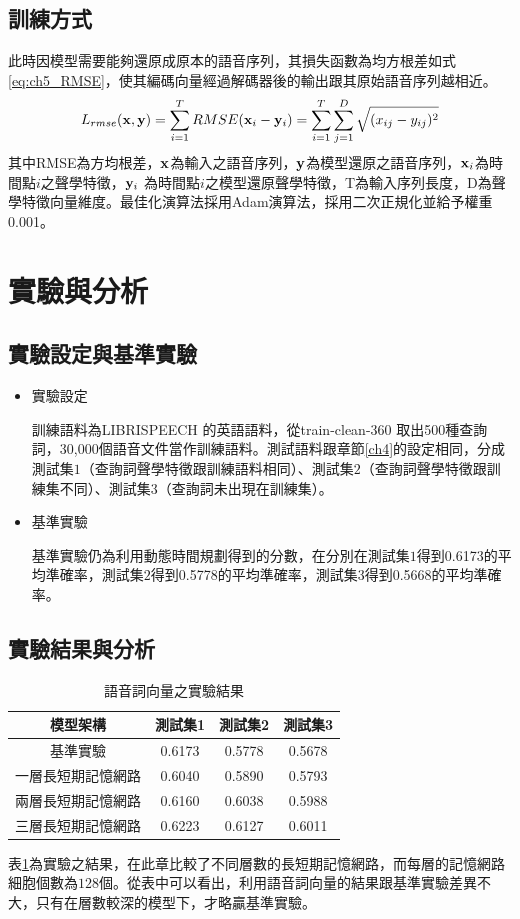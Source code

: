 \subsection{訓練方式}
此時因模型需要能夠還原成原本的語音序列，其損失函數為均方根差如式\ref{eq:ch5_RMSE}，使其編碼向量經過解碼器後的輸出跟其原始語音序列越相近。
\begin{equation}
\label{eq:ch5_RMSE}
L_{rmse} (\bold{x},\bold{y}) = \sum_{i=1}^{T}
RMSE(\bold{x}_i-\bold{y}_i) = \sum_{i=1}^{T} \sum_{j=1}^D \sqrt{(x_{ij}-y_{ij})^2}
\end{equation}
其中RMSE為方均根差，$\bold{x}$為輸入之語音序列，$\bold{y}$為模型還原之語音序列，$\bold{x}_i$為時間點$i$之聲學特徵，$\bold{y}_i$
為時間點$i$之模型還原聲學特徵，T為輸入序列長度，D為聲學特徵向量維度。最佳化演算法採用Adam演算法，採用二次正規化並給予權重0.001。

\section{實驗與分析}
\subsection{實驗設定與基準實驗}
\begin{itemize}
\item{實驗設定}

訓練語料為LIBRISPEECH 的英語語料，從train-clean-360
取出500種查詢詞，30,000個語音文件當作訓練語料。測試語料跟章節\ref{ch4}的設定相同，分成測試集$1$（查詢詞聲學特徵跟訓練語料相同）、測試集$2$（查詢詞聲學特徵跟訓練集不同）、測試集$3$（查詢詞未出現在訓練集）。
\item{基準實驗}

基準實驗仍為利用動態時間規劃得到的分數，在分別在測試集$1$得到0.6173的平均準確率，測試集$2$得到0.5778的平均準確率，測試集$3$得到0.5668的平均準確率。
\end{itemize}
\subsection{實驗結果與分析}

\begin{table}[h]
	 \centering
	 \caption{語音詞向量之實驗結果}
	 \label{table:ch5_a2v}
	 \begin{tabular}{|c|c|c|c|}
		 \hline
		 模型架構 & 測試集1 & 測試集2 & 測試集3 \\
		 \hline
		 基準實驗 & 0.6173 & 0.5778 & 0.5678\\
		 \hline
		 一層長短期記憶網路& 0.6040 & 0.5890 & 0.5793 \\
		 \hline
		 兩層長短期記憶網路& 0.6160 &0.6038 &0.5988\\
		 \hline
		 三層長短期記憶網路& {\color{red}0.6223} &0.6127 &0.6011\\
		 \hline
	   \end{tabular}
\end{table}
表\ref{table:ch5_a2v}為實驗之結果，在此章比較了不同層數的長短期記憶網路，而每層的記憶網路細胞個數為$128$個。從表中可以看出，利用語音詞向量的結果跟基準實驗差異不大，只有在層數較深的模型下，才略贏基準實驗。

